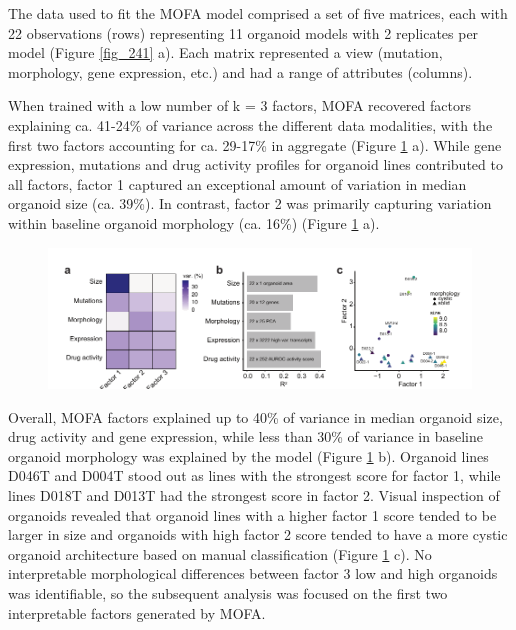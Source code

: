 \begin{flushleft}
\bigbreak
The data used to fit the MOFA model comprised a set of five matrices, each with 22 observations (rows) representing 11 organoid models with 2 replicates per model (Figure \ref{fig_241} a). Each matrix represented a view (mutation, morphology, gene expression, etc.) and had a range of attributes (columns).


\bigbreak
When trained with a low number of k = 3 factors, MOFA recovered factors explaining ca. 41-24\% of variance across the different data modalities, with the first two factors accounting for ca. 29-17\% in aggregate (Figure \ref{fig_240} a). While gene expression, mutations and drug activity profiles for organoid lines contributed to all factors, factor 1 captured an exceptional amount of variation in median organoid size (ca. 39\%). In contrast, factor 2 was primarily capturing variation within baseline organoid morphology (ca. 16\%) (Figure \ref{fig_240} a).

\begin{figure}[h!]
\centering
\includegraphics[width=\textwidth,
                height=\textheight,
                keepaspectratio]{figures/promise/pdf/fig_4_0.pdf}
\caption{}
\label{fig_240}
\end{figure}

\bigbreak
Overall, MOFA factors explained up to 40\% of variance in median organoid size, drug activity and gene expression, while less than 30\% of variance in baseline organoid morphology was explained by the model (Figure \ref{fig_240} b). Organoid lines D046T and D004T stood out as lines with the strongest score for factor 1, while lines D018T and D013T had the strongest score in factor 2. Visual inspection of organoids revealed that organoid lines with a higher factor 1 score tended to be larger in size and organoids with high factor 2 score tended to have a more cystic organoid architecture based on manual classification (Figure \ref{fig_240} c). No interpretable morphological differences between factor 3 low and high organoids was identifiable, so the subsequent analysis was focused on the first two interpretable factors generated by MOFA. 


\end{flushleft}
